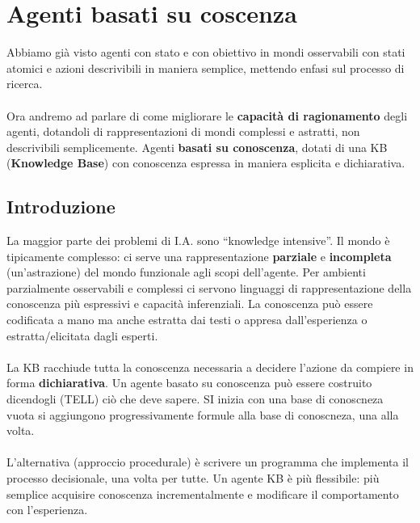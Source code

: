 \newpage
\section{Agenti basati su coscenza}
Abbiamo già visto agenti con stato e con obiettivo in mondi osservabili con stati atomici e azioni descrivibili
in maniera semplice, mettendo enfasi sul processo di ricerca.\\\\
Ora andremo ad parlare di come migliorare le \textbf{capacità di ragionamento} degli agenti,
dotandoli di rappresentazioni di mondi complessi e astratti, non descrivibili semplicemente.
Agenti \textbf{basati su conoscenza}, dotati di una KB (\textbf{Knowledge Base}) con conoscenza espressa in maniera esplicita e dichiarativa.
\subsection{Introduzione}
La maggior parte dei problemi di I.A. sono “knowledge intensive”. Il mondo è tipicamente complesso: ci serve una rappresentazione
\textbf{parziale} e \textbf{incompleta} (un’astrazione) del mondo funzionale agli scopi dell’agente. Per ambienti parzialmente osservabili e complessi ci servono
linguaggi di rappresentazione della conoscenza più espressivi e capacità inferenziali. La conoscenza può essere codificata a mano ma anche estratta dai
testi o appresa dall’esperienza o estratta/elicitata dagli esperti.\\\\
La KB racchiude tutta la conoscenza necessaria a decidere l’azione da compiere in forma \textbf{dichiarativa}.
Un agente basato su conoscenza può essere costruito dicendogli (TELL) ciò che deve sapere. SI inizia con una base di conoscneza vuota
si aggiungono progressivamente formule alla base di conoscneza, una alla volta.\\\\
L’alternativa (approccio procedurale) è scrivere un programma che implementa il processo decisionale, una
volta per tutte. Un agente KB è più flessibile: più semplice acquisire conoscenza incrementalmente e modificare il
comportamento con l’esperienza.
